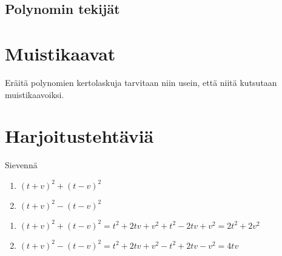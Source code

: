 \subsection*{Polynomin tekijät}

\section{Muistikaavat}

Eräitä polynomien kertolaskuja tarvitaan niin usein, että niitä kutsutaan muistikaavoiksi.



\section{Harjoitustehtäviä}

\begin{tehtava}
    Sievennä
    \begin{enumerate}
        \item $(t+v)^2+(t-v)^2$
        \item $(t+v)^2-(t-v)^2$
    \end{enumerate}
    \begin{vastaus}
        \begin{enumerate}
            \item $(t+v)^2+(t-v)^2 = t^2+2tv+v^2+t^2-2tv+v^2 = 2t^2+2v^2$
            \item $(t+v)^2-(t-v)^2 = t^2+2tv+v^2-t^2+2tv-v^2 = 4tv$
        \end{enumerate}
    \end{vastaus}
\end{tehtava}

